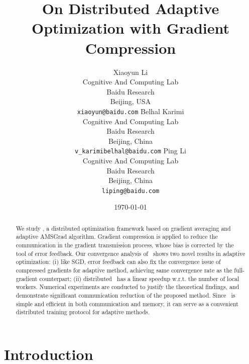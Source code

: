 \documentclass[11pt]{article}
\begin{document}
\title{On Distributed Adaptive Optimization with Gradient Compression}

\author{
Xiaoyun Li \\
  Cognitive And Computing Lab\\
  Baidu Research\\
  Beijing, USA \\
  \texttt{xiaoyun@baidu.com} 
   \And
  Belhal Karimi \\
  Cognitive And Computing Lab\\
  Baidu Research\\
  Beijing, China \\
  \texttt{v_karimibelhal@baidu.com} 
   \And
  Ping Li \\
  Cognitive And Computing Lab\\
  Baidu Research\\
  Beijing, China \\
  \texttt{liping@baidu.com} \\
}

\date{\today}

\maketitle

\vspace{-0.1in}
\begin{abstract}
We study \algo, a distributed optimization framework based on gradient averaging and adaptive AMSGrad algorithm. Gradient compression is applied to reduce the communication in the gradient transmission process, whose bias is corrected by the tool of error feedback. Our convergence analysis of \algo\ shows two novel results in adaptive optimization: (i) like SGD, error feedback can also fix the convergence issue of compressed gradients for adaptive method, achieving same convergence rate as the full-gradient counterpart; (ii) distributed \algo\ has a linear speedup w.r.t. the number of local workers. Numerical experiments are conducted to justify the theoretical findings, and demonstrate significant communication reduction of the proposed method. Since \algo\ is simple and efficient in both communication and memory, it can serve as a convenient distributed training protocol for adaptive methods.

\end{abstract}

\vspace{-0.05in}
\section{Introduction}\label{sec:introduction}
\vspace{-0.05in}
\end{document}
